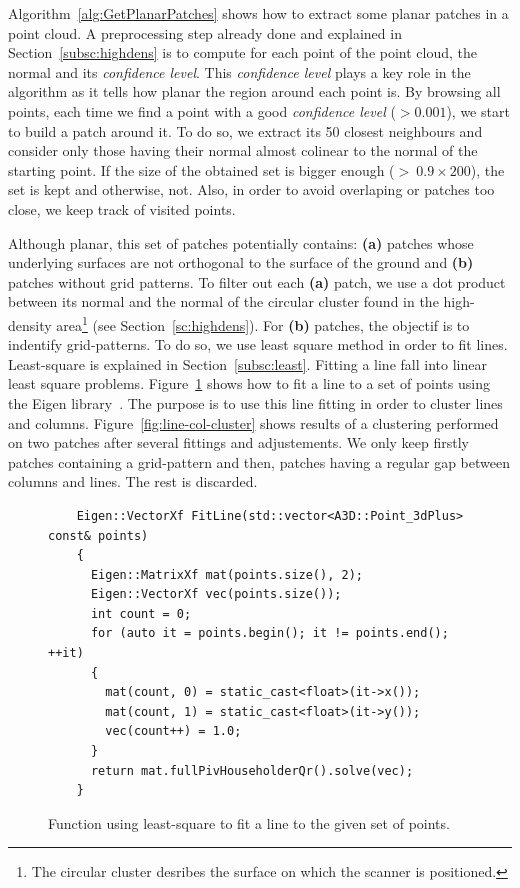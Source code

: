 Algorithm~\ref{alg:GetPlanarPatches} shows how to extract some planar patches in a point cloud. A preprocessing step already done and explained in Section~\ref{subsc:highdens} is to compute for each point of the point cloud, the normal and its \emph{confidence level}. This \emph{confidence level} plays a key role in the algorithm as it tells how planar the region around each point is. By browsing all points, each time we find a point with a good \emph{confidence level} ($> 0.001$), we start to build a patch around it. To do so, we extract its 50
closest neighbours and consider only those having their normal almost colinear to the normal of the starting point. If the size of the obtained set is bigger enough ($>\ 0.9 \times 200$), the set is kept and otherwise, not. Also, in order to avoid overlaping or patches too close, we keep track of visited points.

Although planar, this set of patches potentially contains: \textbf{(a)} patches whose underlying surfaces are not orthogonal to the surface of the ground and \textbf{(b)} patches without grid patterns. To filter out each \textbf{(a)} patch, we use a dot product between its normal and the normal of the circular cluster found in the high-density area\footnote{The circular cluster desribes the surface on which the scanner is positioned.} (see Section~\ref{sc:highdens}). For \textbf{(b)} patches,
the objectif is to indentify grid-patterns. To do so, we use least square method in order to fit lines. Least-square is explained in Section~\ref{subsc:least}. Fitting a line fall into linear least square problems. Figure~\ref{fig:fitline} shows how to fit a line to a set of points using the Eigen library~\cite{eigenweb}. The purpose is to use this line fitting in order to cluster lines and columns. Figure~\ref{fig:line-col-cluster} shows results of a clustering performed on two patches after several fittings and adjustements. We only keep firstly patches containing a grid-pattern and then, patches having a regular gap between columns and lines. The rest is discarded.

\begin{figure}
  \centering
  \begin{lstlisting}
    Eigen::VectorXf FitLine(std::vector<A3D::Point_3dPlus> const& points)
    {
      Eigen::MatrixXf mat(points.size(), 2);
      Eigen::VectorXf vec(points.size());
      int count = 0;
      for (auto it = points.begin(); it != points.end(); ++it)
      {
        mat(count, 0) = static_cast<float>(it->x());
        mat(count, 1) = static_cast<float>(it->y());
        vec(count++) = 1.0;
      }
      return mat.fullPivHouseholderQr().solve(vec);
    }
  \end{lstlisting}
  \caption{Function using least-square to fit a line to the given set of points.}
  \label{fig:fitline}
\end{figure}


